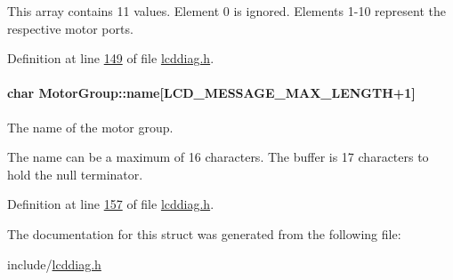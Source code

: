 This array contains 11 values. Element 0 is ignored. Elements 1-\/10 represent the respective motor ports. 

Definition at line \hyperlink{lcddiag_8h_source_l00149}{149} of file \hyperlink{lcddiag_8h_source}{lcddiag.\+h}.

\paragraph[{\texorpdfstring{name}{name}}]{\setlength{\rightskip}{0pt plus 5cm}char Motor\+Group\+::name\mbox{[}{\bf L\+C\+D\+\_\+\+M\+E\+S\+S\+A\+G\+E\+\_\+\+M\+A\+X\+\_\+\+L\+E\+N\+G\+TH}+1\mbox{]}}\hypertarget{struct_motor_group_a8f7c6b03cfece909eb0db0b67ce24e6a}{}\label{struct_motor_group_a8f7c6b03cfece909eb0db0b67ce24e6a}
The name of the motor group.

The name can be a maximum of 16 characters. The buffer is 17 characters to hold the null terminator. 

Definition at line \hyperlink{lcddiag_8h_source_l00157}{157} of file \hyperlink{lcddiag_8h_source}{lcddiag.\+h}.



The documentation for this struct was generated from the following file\+:\begin{DoxyCompactItemize}
\item 
include/\hyperlink{lcddiag_8h}{lcddiag.\+h}\end{DoxyCompactItemize}
